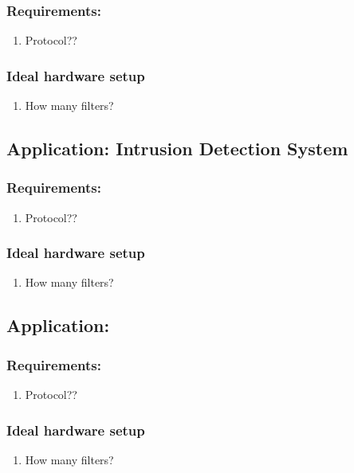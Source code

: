 \subsubsection{Requirements:}
\begin{enumerate}
    \item Protocol??
\end{enumerate}

\subsubsection{Ideal hardware setup}
\begin{enumerate}
    \item How many filters?
\end{enumerate}

\subsection{Application: Intrusion Detection System }

\subsubsection{Requirements:}
\begin{enumerate}
    \item Protocol??
\end{enumerate}

\subsubsection{Ideal hardware setup}
\begin{enumerate}
    \item How many filters?
\end{enumerate}




\subsection{Application: }

\subsubsection{Requirements:}
\begin{enumerate}
    \item Protocol??
\end{enumerate}

\subsubsection{Ideal hardware setup}
\begin{enumerate}
    \item How many filters?
\end{enumerate}



